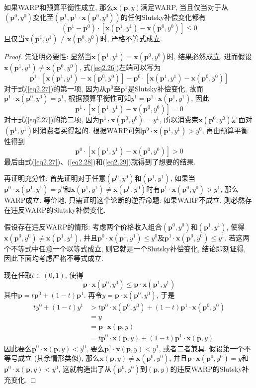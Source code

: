 \documentclass[cn, 12pt, math=mtpro2, bibstyle=apa, blue, twocol]{elegantbook}
\newcommand{\p}{\mathbf{p}}
\newcommand{\x}{\mathbf{x}}
\begin{document}
\begin{theorem}
  如果WARP和预算平衡性成立, 那么$\x(\p,y)$满足WARP, 当且仅当对于从$(\p^0,y^0)$变化至$(\p^1,\p^1\cdot \x(\p^0,y^0))$的任何Slutsky补偿变化都有
  \begin{equation}\label{eq2.26}
    (\p^1-\p^0)\cdot[\x(\p^1,y^1)-\x(\p^0,y^0)]\le0
  \end{equation}
  且仅当$\x(\p^1,y^1)\neq \x(\p^0,y^0)$时, 严格不等式成立.
\end{theorem}
\begin{proof}
  先证明必要性: 显然当$\x(\p^1,y^1)=\x(\p^0,y^0)$时, 结果必然成立, 进而假设$\x(\p^1,y^1)\neq \x(\p^0,y^0)$, 式(\ref{eq2.26})左端可以写为
  \begin{equation}\label{eq2.27}
    \p^1\cdot[\x(\p^1,y^1)-\x(\p^0,y^0)]-\p^0\cdot[\x(\p^1,y^1)-\x(\p^0,y^0)]
  \end{equation}
  对于式(\ref{eq2.27})的第一项, 因为从$\p^0$至$\p^1$是Slutsky补偿变化, 故而$\p^1\cdot\x(\p^0,y^0)=y^1$, 根据预算平衡性可知$y^1=\p^1\cdot\x(\p^1,y^1)$, 因此
  \begin{equation}\label{eq2.28}
    \p^1\cdot[\x(\p^1,y^1)-\x(\p^0,y^0)]=0
  \end{equation}
  对于式(\ref{eq2.27})的第二项, 因为$\p^1\cdot\x(\p^0,y^0)=y^1$, 所以消费束$\x(\p^0,y^0)$是面对$(\p^1,y^1)$时消费者买得起的. 根据WARP可知$\p^0\cdot\x(\p^1,y^1)>y^0$, 再由预算平衡性得到
  \begin{equation}\label{eq2.29}
    \p^0\cdot[\x(\p^1,y^1)-\x(\p^0,y^0)]>0
  \end{equation}
  最后由式(\ref{eq2.27})、(\ref{eq2.28})和(\ref{eq2.29})就得到了想要的结果.
  
  再证明充分性: 首先证明对于任意$(\p^0,y^0)$和$(\p^1,y^1)$, 如果当$\p^0\cdot\x(\p^1,y^1)=y^0$和$\x(\p^1,y^1)\neq \x(\p^0,y^0)$时有$\p^1\cdot\x(\p^0,y^0)>y^1$, 那么WARP成立. 等价地, 只需证明这个论断的逆否命题: 如果WARP不成立, 则必然存在违反WARP的Slutsky补偿变化.
   
   假设存在违反WARP的情形: 考虑两个价格收入组合$(\p^0,y^0)$和$(\p^1,y^1)$, 使得$\x(\p^0,y^0)\neq \x(\p^1,y^1)$, 并且$\p^0\cdot\x(\p^1,y^1)\leq y^0$及$\p^1\cdot\x(\p^0,y^0)\leq y^1$. 若这两个不等式中任意一个以等式成立, 则它就是一个Slutsky补偿变化, 结论即刻证得, 因此下面均考虑严格不等式成立.
  
  现在任取$t\in(0,1)$, 使得
  $$\p\cdot\x(\p^0,y^0)\leq \p\cdot\x(\p^1,y^1)$$
  其中$\p=t\p^0+(1-t)\p^1$. 再令$y=\p\cdot\x(\p^0,y^0)$, 于是
  \begin{align*}
  ty^0+(1-t)y^1&>t\p^0\cdot\x(\p^0,y^0)+(1-t)\p^1\cdot\x(\p^0,y^0) \\
  &=y \\
  &=\p\cdot\x(\p,y) \\
  &=t\p^0\cdot\x(\p,y)+(1-t)\p^1\cdot\x(\p,y)
  \end{align*}
  因此要么$\p^0\cdot\x(\p,y)<y^0$, 要么$\p^1\cdot\x(\p,y)<y^1$, 或者二者兼具. 假设第一个不等号成立 (其余情形类似), 那么$\x(\p,y)\neq \x(\p^0,y^0)$, 并且$\p\cdot\x(\p^0,y^0)=y$和$\p^0\cdot\x(\p,y)<y^0$, 这就构造出了从$(\p^0,y^0)$到$(\p,y)$的违反WARP的Slutsky补充变化.
  

\end{proof}
\end{document}
